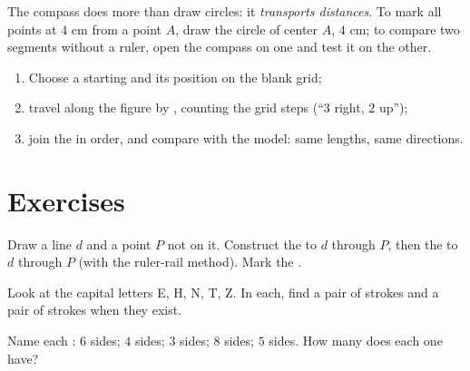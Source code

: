 \begin{example}\label{ex:g4:geometry:compass}
The compass does more than draw circles: it \emph{transports
distances}. To mark all points at $4$ cm from a point $A$, draw the
circle of center $A$,  $4$ cm; to compare two segments without
a ruler, open the compass on one and test it on the other.
\end{example}

\begin{method}\label{met:g4:geometry:reproduce}
\begin{enumerate}
  \item Choose a starting  and its position on the blank grid;
  \item travel along the figure  by , counting the grid
        steps (``$3$ right, $2$ up'');
  \item join the  in order, and compare with the model:
        same lengths, same directions.
\end{enumerate}
\end{method}

\section{Exercises}

\begin{exercise}[$\star$]\label{exo:g4:geometry:1}
Draw a line $d$ and a point $P$ not on it. Construct the
 to $d$ through $P$, then the  to $d$ through
$P$ (with the ruler-rail method). Mark the .
\end{exercise}

\begin{exercise}[$\star$]\label{exo:g4:geometry:2}
Look at the capital letters E, H, N, T, Z. In each, find a pair of
 strokes and a pair of  strokes when they
exist.
\end{exercise}

\begin{exercise}[$\star$]\label{exo:g4:geometry:3}
Name each : $6$ sides; $4$ sides; $3$ sides; $8$ sides;
$5$ sides. How many \emph{} does each one have?
\end{exercise}

